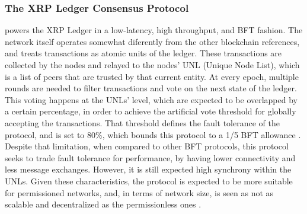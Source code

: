 \documentclass[journal]{IEEEtran}
\begin{document}
\subsubsection{The XRP Ledger Consensus Protocol} powers the XRP Ledger in a
low-latency, high throughput, and  BFT fashion. The network itself operates somewhat
diferently from the other blockchain references, and treats transactions as atomic units of 
the ledger. These transactions are collected by the nodes and relayed to the
nodes' UNL (Unique Node List), which is a list of peers that are trusted by that current
entity. At every epoch, multiple rounds are needed to filter transactions and vote 
on the next state of the ledger. This voting happens at the 
UNLs' level, which are expected to be overlapped by a certain percentage,
in order to achieve the artificial vote threshold for globally accepting the transactions.
That threshold defines the fault tolerance of the protocol, and is set to 80\%, which 
bounds this protocol to a 1/5 BFT allowance \cite{schwartz2014ripple, chase2018analysis}. 
Despite that limitation, when compared to other BFT protocols, this protocol seeks to trade 
fault tolerance for performance, by having lower connectivity and less message exchanges. 
However, it is still expected high synchrony within the UNLs. Given these characteristics, the protocol
is expected to be more suitable for permissioned networks, and, in terms of network size,
is seen as not as scalable and decentralized as the permissionless ones \cite{survey-dist-consensus}.



%
%
\end{document}
